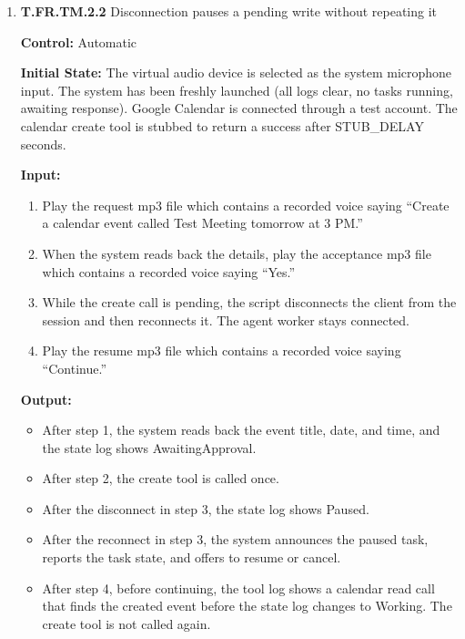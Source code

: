 \documentclass[12pt, titlepage]{article}
\begin{document}
\begin{enumerate}
\textbf{Pass/Fail Criteria:}
\begin{itemize}
  \item All Output conditions hold.
  \item The status update starts within \textsc{IDLE\_PROMPT\_TIME} of the system's last speech.
\end{itemize}

\textbf{How test will be performed:} A script plays the audio files into the virtual device, triggering each step from the session event log. It reads the task manager state log, the tool call log, and the text and timestamps of system speech, and asserts each output condition.

\item{\textbf{T.FR.TM.2.2} Disconnection pauses a pending write without repeating it\\}\label{test:T.FR.TM.2.2}

\textbf{Control:} Automatic

\textbf{Initial State:} The virtual audio device is selected as the system microphone input. 
The system has been freshly launched (all logs clear, no tasks running, awaiting response).
Google Calendar is connected through a test account. The calendar create tool is stubbed to return a success after \textsc{STUB\_DELAY} seconds.

\textbf{Input:}
\begin{enumerate}
  \item Play the request mp3 file which contains a recorded voice saying ``Create a calendar event called Test Meeting tomorrow at 3 PM.''
  \item When the system reads back the details, play the acceptance mp3 file which contains a recorded voice saying ``Yes.''
  \item While the create call is pending, the script disconnects the client from the session and then reconnects it. The agent worker stays connected.
  \item Play the resume mp3 file which contains a recorded voice saying ``Continue.''
\end{enumerate}

\textbf{Output:}
\begin{itemize}
  \item After step 1, the system reads back the event title, date, and time, and the state log shows AwaitingApproval.
  \item After step 2, the create tool is called once.
  \item After the disconnect in step 3, the state log shows Paused.
  \item After the reconnect in step 3, the system announces the paused task, reports the task state, and offers to resume or cancel.
  \item After step 4, before continuing, the tool log shows a calendar read call that finds the created event before the state log changes to Working. The create tool is not called again.
\end{itemize}


\end{enumerate}
\end{document}
